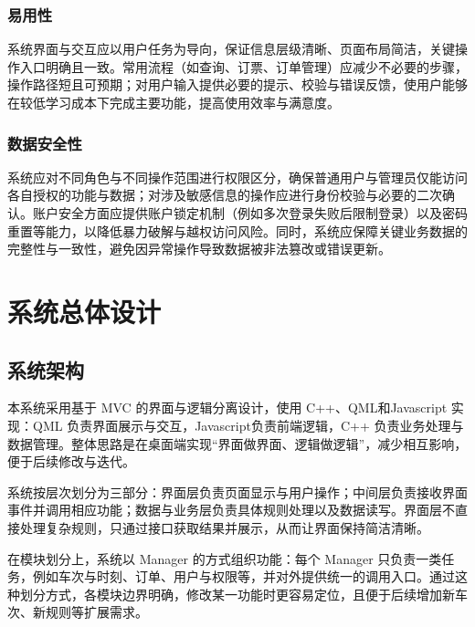 \documentclass{article}
\begin{document}
	\subsubsection{易用性}
	系统界面与交互应以用户任务为导向，保证信息层级清晰、页面布局简洁，关键操作入口明确且一致。常用流程（如查询、订票、订单管理）应减少不必要的步骤，操作路径短且可预期；对用户输入提供必要的提示、校验与错误反馈，使用户能够在较低学习成本下完成主要功能，提高使用效率与满意度。
	
	\subsubsection{数据安全性}
	系统应对不同角色与不同操作范围进行权限区分，确保普通用户与管理员仅能访问各自授权的功能与数据；对涉及敏感信息的操作应进行身份校验与必要的二次确认。账户安全方面应提供账户锁定机制（例如多次登录失败后限制登录）以及密码重置等能力，以降低暴力破解与越权访问风险。同时，系统应保障关键业务数据的完整性与一致性，避免因异常操作导致数据被非法篡改或错误更新。
	
	\section{系统总体设计}
	\subsection{系统架构}
	本系统采用基于 MVC 的界面与逻辑分离设计，使用 C++、QML和Javascript 实现：QML 负责界面展示与交互，Javascript负责前端逻辑，C++ 负责业务处理与数据管理。整体思路是在桌面端实现“界面做界面、逻辑做逻辑”，减少相互影响，便于后续修改与迭代。
	
	系统按层次划分为三部分：界面层负责页面显示与用户操作；中间层负责接收界面事件并调用相应功能；数据与业务层负责具体规则处理以及数据读写。界面层不直接处理复杂规则，只通过接口获取结果并展示，从而让界面保持简洁清晰。
	
	在模块划分上，系统以 Manager 的方式组织功能：每个 Manager 只负责一类任务，例如车次与时刻、订单、用户与权限等，并对外提供统一的调用入口。通过这种划分方式，各模块边界明确，修改某一功能时更容易定位，且便于后续增加新车次、新规则等扩展需求。
	
\end{document}
